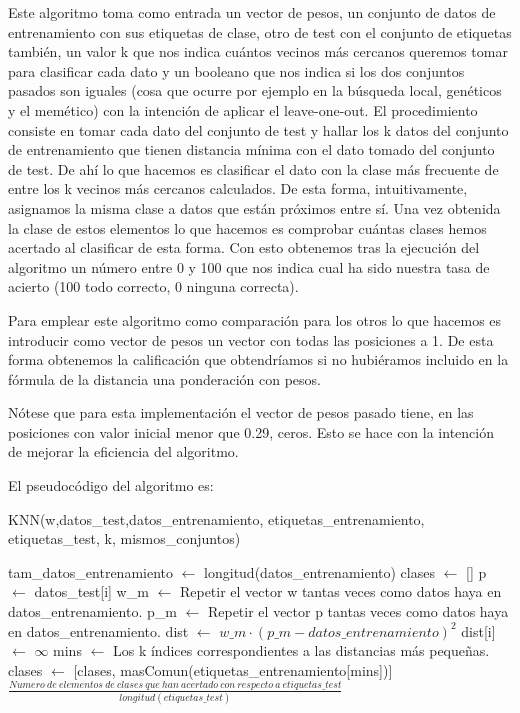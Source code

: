 \documentclass[12pt,a4paper]{article}
\begin{document}
	Este algoritmo toma como entrada un vector de pesos, un conjunto de datos de entrenamiento con sus etiquetas de clase, otro de test con el conjunto de etiquetas también, un valor k que nos indica cuántos vecinos más cercanos queremos tomar para clasificar cada dato y un booleano que nos indica si los dos conjuntos pasados son iguales (cosa que ocurre por ejemplo en la búsqueda local, genéticos y el memético) con la intención de aplicar el leave-one-out. 
	El procedimiento consiste en tomar cada dato del conjunto de test y hallar los k datos del conjunto de entrenamiento que tienen distancia mínima con el dato tomado del conjunto de test. De ahí lo que hacemos es clasificar el dato con la clase más frecuente de entre los k vecinos más cercanos calculados. De esta forma, intuitivamente, asignamos la misma clase a datos que están próximos entre sí. Una vez obtenida la clase de estos elementos lo que hacemos es comprobar cuántas clases hemos acertado al clasificar de esta forma. Con esto obtenemos tras la ejecución del algoritmo un número entre 0 y 100 que nos indica cual ha sido nuestra tasa de acierto (100 todo correcto, 0 ninguna correcta).
	
	Para emplear este algoritmo como comparación para los otros lo que hacemos es introducir como vector de pesos un vector con todas las posiciones a 1. De esta forma obtenemos la calificación que obtendríamos si no hubiéramos incluido en la fórmula de la distancia una ponderación con pesos.
	
	Nótese que para esta implementación el vector de pesos pasado tiene, en las posiciones con valor inicial menor que 0.29, ceros. Esto se hace con la intención de mejorar la eficiencia del algoritmo.
	
	El pseudocódigo del algoritmo es:
	\begin{algorithm}
		\caption{KNN(w,datos\_test,datos\_entrenamiento, etiquetas\_entrenamiento, etiquetas\_test, k, mismos\_conjuntos)}
		\begin{algorithmic}
			\STATE tam\_datos\_entrenamiento $\leftarrow$ longitud(datos\_entrenamiento)
			\STATE clases $\leftarrow$ []
			\STATE p $\leftarrow$ datos\_test[i]
			\STATE w\_m $\leftarrow$ Repetir el vector w tantas veces como datos haya en datos\_entrenamiento.
			\STATE p\_m $\leftarrow$ Repetir el vector p tantas veces como datos haya en datos\_entrenamiento.
			\STATE dist $\leftarrow$ $w\_m \cdot (p\_m - datos\_entrenamiento)^2$
			\STATE dist[i] $\leftarrow$ $\infty$
			\ENDIF
			\STATE mins $\leftarrow$ Los k índices correspondientes a las distancias más pequeñas.
			\STATE clases $\leftarrow$ [clases, masComun(etiquetas\_entrenamiento[mins])]
			\ENDFOR
			\RETURN $\frac{Numero \ de \ elementos \ de \ clases \ que \ han \ acertado \ con \ respecto \ a \ etiquetas\_test}{longitud(etiquetas\_test)}$
		\end{algorithmic}
	\end{algorithm}
	
\end{document}
